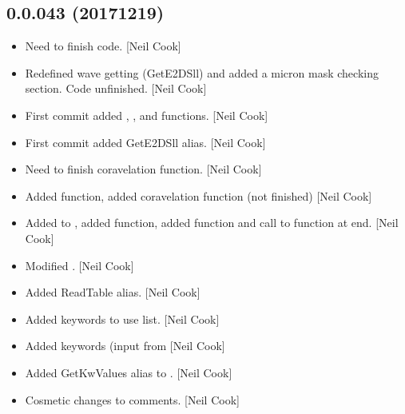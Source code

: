 \documentclass[a4paper,10pt,english]{report}
\begin{document}
\subsection{0.0.043 (2017\sphinxhyphen{}12\sphinxhyphen{}19)}
\label{\detokenize{misc/changelog:id527}}\begin{itemize}
\item {} 
Need to finish code. {[}Neil Cook{]}

\item {} 
Redefined wave getting (GetE2DSll) and added a micron mask checking
section. Code unfinished. {[}Neil Cook{]}

\item {} 
First commit added , , and
 functions. {[}Neil Cook{]}

\item {} 
First commit added GetE2DSll alias. {[}Neil Cook{]}

\item {} 
Need to finish coravelation function. {[}Neil Cook{]}

\item {} 
Added  function, added coravelation function (not
finished) {[}Neil Cook{]}

\item {} 
Added to , added  function, added 
function and call to function at end. {[}Neil Cook{]}

\item {} 
Modified . {[}Neil Cook{]}

\item {} 
Added ReadTable alias. {[}Neil Cook{]}

\item {} 
Added keywords to use list. {[}Neil Cook{]}

\item {} 
Added  keywords (input from  {[}Neil Cook{]}

\item {} 
Added GetKwValues alias to . {[}Neil Cook{]}

\item {} 
Cosmetic changes to comments. {[}Neil Cook{]}

\end{itemize}
\end{document}
